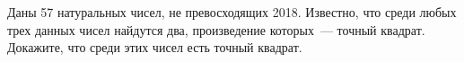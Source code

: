 \begin{problems}
\item
Даны 57 натуральных чисел, не превосходящих 2018.
Известно, что среди любых трех данных чисел найдутся два, произведение
которых~--- точный квадрат.
Докажите, что среди этих чисел есть точный квадрат.


\end{problems}

